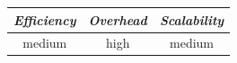 %
%
%


\begin{center}
\begin{tabular}{ccc}
\emph{Efficiency} & \emph{Overhead} & \emph{Scalability} \\
\hline
medium &
high &
medium
\end{tabular}
\end{center}


